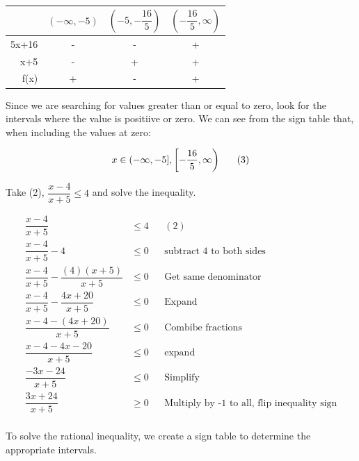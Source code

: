 \documentclass[12pt]{book}
\begin{document}
\begin{enumerate}
\begin{center}
    \begin{tabular}{|r|c|c|c|}
        \hline
        & $(-\infty, -5)$ & $\left(-5, -\dfrac{16}{5} \right)$ & $\left( -\dfrac{16}{5}, \infty \right)$ \\ \hline
        5x+16 & - & - & + \\ \hline
        x+5 & - & + & + \\ \hline
        f(x) & + & - & + \\ \hline
    \end{tabular}
\end{center}

\vspace{0.3cm}

Since we are searching for values greater than or equal to zero,
 look for the intervals where the value is positiive or zero. We can see
  from the sign table that, when including the values at zero:

$$x \in (-\infty, -5], \left[ -\frac{16}{5}, \infty \right) \text{\space\space\space\space\space} (3)$$

\vspace{1cm}

Take (2), $\dfrac{x-4}{x+5} \le 4$ and solve the inequality.

\begin{align*}
    \dfrac{x-4}{x+5} &\le 4 && (2)\\
    \dfrac{x-4}{x+5} - 4 &\le 0 && \text{subtract 4 to both sides} \\
    \dfrac{x-4}{x+5} - \dfrac{(4)(x+5)}{x+5} &\le 0 && \text{Get same denominator} \\
    \dfrac{x-4}{x+5} - \dfrac{4x+20}{x+5} &\le 0 && \text{Expand} \\
    \dfrac{x-4-(4x+20)}{x+5} &\le 0 && \text{Combibe fractions} \\
    \dfrac{x-4-4x-20}{x+5} &\le 0 && \text{expand} \\
    \dfrac{-3x-24}{x+5} &\le 0 && \text{Simplify} \\
    \dfrac{3x+24}{x+5} &\geq 0 && \text{Multiply by -1 to all, flip inequality sign} \\
\end{align*}

\newpage

\begin{center}
To solve the rational inequality, we create a sign table
 to determine the appropriate intervals.
\end{center}
\vspace{0.5cm}


\end{enumerate}
\end{document}
